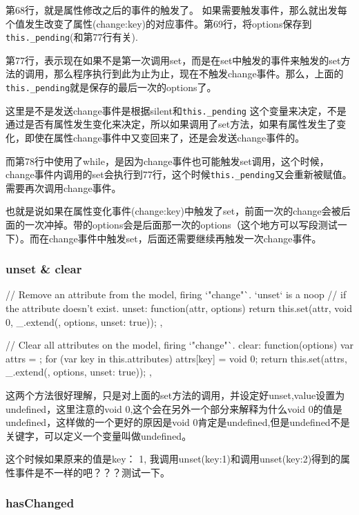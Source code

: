 第68行，就是属性修改之后的事件的触发了。 如果需要触发事件，那么就出发每个值发生改变了属性(change:key)的对应事件。第69行，将options保存到\lstinline$this._pending$(和第77行有关).

第77行，表示现在如果不是第一次调用set，而是在set中触发的事件来触发的set方法的调用，那么程序执行到此为止为止，现在不触发change事件。那么，上面的\lstinline$this._pending$就是保存的最后一次的options了。

这里是不是发送change事件是根据silent和\lstinline$this._pending$ 这个变量来决定，不是通过是否有属性发生变化来决定，所以如果调用了set方法，如果有属性发生了变化，即使在属性change事件中又变回来了，还是会发送change事件的。

而第78行中使用了while，是因为change事件也可能触发set调用，这个时候，change事件内调用的set会执行到77行，这个时候\lstinline$this._pending$又会重新被赋值。需要再次调用change事件。


也就是说如果在属性变化事件(change:key)中触发了set，前面一次的change会被后面的一次冲掉。带的options会是后面那一次的options（这个地方可以写段测试一下）。而在change事件中触发set，后面还需要继续再触发一次change事件。

\subsubsection{unset \& clear}

\begin{JavaScript}
    // Remove an attribute from the model, firing `"change"`. `unset` is a noop
    // if the attribute doesn't exist.
    unset: function(attr, options) {
      return this.set(attr, void 0, _.extend({}, options, {unset: true}));
    },

    // Clear all attributes on the model, firing `"change"`.
    clear: function(options) {
      var attrs = {};
      for (var key in this.attributes) attrs[key] = void 0;
      return this.set(attrs, _.extend({}, options, {unset: true}));
    },
\end{JavaScript}

这两个方法很好理解，只是对上面的set方法的调用，并设定好unset,value设置为undefined，这里注意的void 0,这个会在另外一个部分来解释为什么void 0的值是undefined，这样做的一个更好的原因是void 0肯定是undefined,但是undefined不是关键字，可以定义一个变量叫做undefined。

这个时候如果原来的值是{key： 1}, 我调用unset({key:1})和调用unset({key:2})得到的属性事件是不一样的吧？？？测试一下。

\subsubsection{hasChanged}

